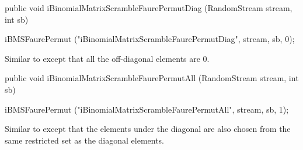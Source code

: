 \begin{htmlonly}
\end{htmlonly}
\begin{code}

   public void iBinomialMatrixScrambleFaurePermutDiag (RandomStream stream,
                                                       int sb)\begin{hide} {
       iBMSFaurePermut ("iBinomialMatrixScrambleFaurePermutDiag",
                               stream, sb, 0);
   }\end{hide}
\end{code}
 \begin{tabb}
   Similar to  except that all the
   off-diagonal elements are 0.
\end{tabb}
\begin{htmlonly}
\end{htmlonly}
\begin{code}

   public void iBinomialMatrixScrambleFaurePermutAll (RandomStream stream,
                                                      int sb)\begin{hide} {
       iBMSFaurePermut ("iBinomialMatrixScrambleFaurePermutAll",
                               stream, sb, 1);
   }\end{hide}
\end{code}
 \begin{tabb}
   Similar to  except that the
   elements under the diagonal are also
   chosen from the same restricted set as the diagonal elements.
\end{tabb}
\begin{htmlonly}
\end{htmlonly}
